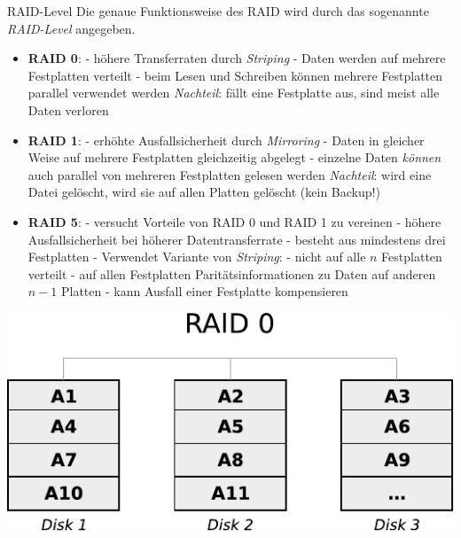 \begin{defi}{RAID-Level}
    Die genaue Funktionsweise des RAID wird durch das sogenannte \emph{RAID-Level} angegeben.

    \begin{itemize}
        \item \textbf{RAID 0}:
              \subitem - höhere Transferraten durch \emph{Striping}
              \subitem - Daten werden auf mehrere Festplatten verteilt
              \subitem - beim Lesen und Schreiben können mehrere Festplatten parallel verwendet werden
              \subitem \emph{Nachteil}: fällt eine Festplatte aus, sind meist alle Daten verloren
        \item \textbf{RAID 1}:
              \subitem - erhöhte Ausfallsicherheit durch \emph{Mirroring}
              \subitem - Daten in gleicher Weise auf mehrere Festplatten gleichzeitig abgelegt
              \subitem - einzelne Daten \emph{können} auch parallel von mehreren Festplatten gelesen werden
              \subitem \emph{Nachteil}: wird eine Datei gelöscht, wird sie auf allen Platten gelöscht (kein Backup!)
        \item \textbf{RAID 5}:
              \subitem - versucht Vorteile von RAID 0 und RAID 1 zu vereinen
              \subitem - höhere Ausfallsicherheit bei höherer Datentransferrate
              \subitem - besteht aus mindestens drei Festplatten
              \subitem - Verwendet Variante von \emph{Striping}:
              \subsubitem - nicht auf alle $n$ Festplatten verteilt
              \subsubitem - auf allen Festplatten Paritätsinformationen zu Daten auf anderen $n-1$ Platten
              \subsubitem - kann Ausfall einer Festplatte kompensieren
    \end{itemize}


    \begin{center}
        \includegraphics[]{images/raid0.pdf}


\end{center}
\end{defi}
